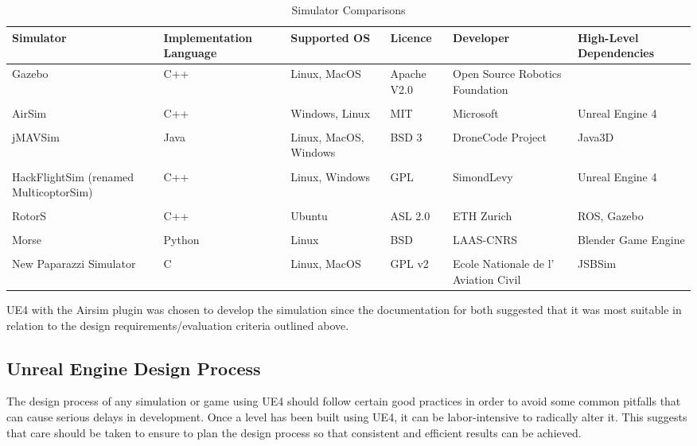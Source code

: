 \begin{center}
\begin{table}
\footnotesize
\centering
\begin{tabular}{ p{2.1cm} p{2.2cm} p{2.1cm} p{2.1cm} p{2.1cm} p{2.1cm}} 
\hline
Simulator & Implementation Language & Supported OS & Licence & Developer & High-Level Dependencies\\
\hline
Gazebo \cite{Koenig2005DesignSimulator} & C++ & Linux, MacOS & Apache V2.0 & Open Source Robotics Foundation & \\
\\
AirSim \cite{Shah2017AirSim:Vehicles} & C++ & Windows, Linux & MIT & Microsoft & Unreal Engine 4\\ 
\\
jMAVSim \cite{jMAVSim} & Java & Linux, MacOS, Windows & BSD 3 & DroneCode Project & Java3D\\
\\
HackFlightSim (renamed MulticoptorSim) \cite{MulticopterSim} & C++ & Linux, Windows & GPL & SimondLevy & Unreal Engine 4 \\
\\
RotorS & C++ & Ubuntu & ASL 2.0 & ETH Zurich & ROS, Gazebo\\
\\
Morse & Python & Linux & BSD & LAAS-CNRS & Blender Game Engine \\
\\
New Paparazzi Simulator & C & Linux, MacOS & GPL v2 & Ecole Nationale de l’ Aviation Civil & JSBSim\\
\hline
\end{tabular}
\caption{Simulator Comparisons}
\label{table:SimulatorComparison}
\end{table}
\end{center}

UE4 with the Airsim plugin was chosen to develop the simulation since the documentation for both suggested that it was most suitable in relation to the design requirements/evaluation criteria outlined above.\par

\subsection{Unreal Engine Design Process}
The design process of any simulation or game using UE4 should follow certain good practices in order to avoid some common pitfalls that can cause serious delays in development. Once a level has been built using UE4, it can be labor-intensive to radically alter it\cite[p.~454]{Rouse2005GamePractice}. This suggests that care should be taken to ensure to plan the design process so that consistent and efficient results can be achieved.

